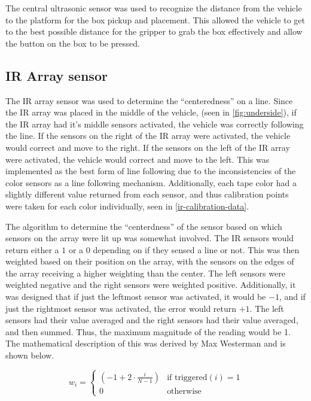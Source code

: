 \documentclass[11pt]{report}
\begin{document}
\par The central ultrasonic sensor was used to recognize the distance from the vehicle to the platform for the box pickup and placement. This allowed the vehicle to get to the best possible distance for the gripper to grab the box effectively and allow the button on the box to be pressed.

\subsection{IR Array sensor}
The \gls{IR} array sensor was used to determine the ``centeredness'' on a line. Since the \gls{IR} array was placed in the middle of the vehicle, (seen in \cref{fig:underside}), if the \gls{IR} array had it's middle sensors activated, the vehicle was correctly following the line. If the sensors on the right of the \gls{IR} array were activated, the vehicle would correct and move to the right. If the sensors on the left of the \gls{IR} array were activated, the vehicle would correct and move to the left. This was implemented as the best form of line following due to the inconsistencies of the color sensors as a line following mechanism. Additionally, each tape color had a slightly different value returned from each sensor, and thus calibration points were taken for each color individually, seen in \cref{ir-calibration-data}.

\par The algorithm to determine the ``centerdness'' of the sensor based on which sensors on the array were lit up was somewhat involved. The \gls{IR} sensors would return either a $1$ or a $0$ depending on if they sensed a line or not. This was then weighted based on their position on the array, with the sensors on the edges of the array receiving a higher weighting than the center. The left sensors were weighted negative and the right sensors were weighted positive. Additionally, it was designed that if just the leftmost sensor was activated, it would be $-1$, and if just the rightmost sensor was activated, the error would return $+1$. The left sensors had their value averaged and the right sensors had their value averaged, and then summed. Thus, the maximum magnitude of the reading would be 1. The mathematical description of this was derived by Max Westerman and is shown below.

\[
w_i = \begin{cases} 
  (-1 + 2 \cdot \frac{i}{N-1}) & \text{if triggered}(i) = 1 \\
  0 & \text{otherwise}
\end{cases}
\]
\end{document}
